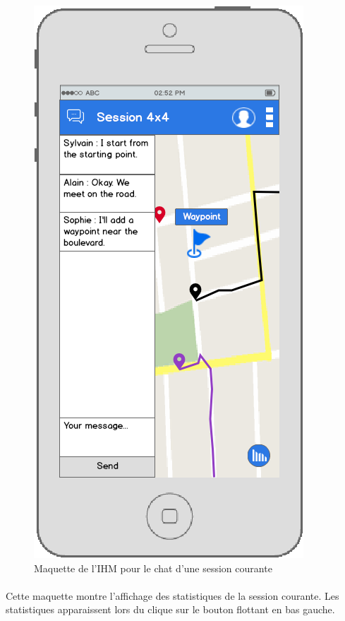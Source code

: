 \documentclass[titlepage, 12pt]{report}
\begin{document}
\begin{figure}[!h]
\caption{Maquette de l'IHM pour le chat d'une session courante}
\label{chat_view}
\centering
\includegraphics[scale=0.3]{images/mockups/chat.png}
\end{figure}

\clearpage

\paragraph{}Cette maquette montre l'affichage des statistiques de la session courante. Les statistiques apparaissent lors du clique sur le bouton flottant en bas gauche.
\end{document}
